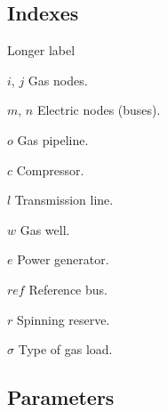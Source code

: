 \subsection*{Indexes}
\begin{labeling}{Longer label\quad}
\item [$i$, $j$] Gas nodes.
\item [$m$, $n$] Electric nodes (buses). 
\item [$o$] Gas pipeline.
\item [$c$] Compressor.
\item [$l$] Transmission line.
\item [$w$] Gas well.
\item [$e$] Power generator.
\item [$ref$] Reference bus.
\item [$r$] Spinning reserve.
\item [$\sigma$] Type of gas load.
\end{labeling}

\subsection*{Parameters}

